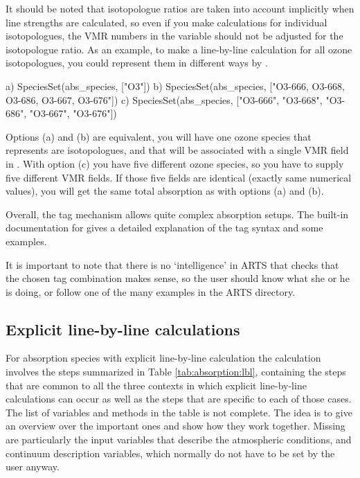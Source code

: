 It should be noted that isotopologue ratios are taken into account
implicitly when line strengths are calculated, so even if you make
calculations for individual isotopologues, the VMR numbers in the
variable  should not be adjusted for the isotopologue
ratio. As an example, to make a line-by-line calculation for all ozone
isotopologues, you could represent them in different ways by
.
\begin{code}
a) SpeciesSet(abs_species, 
              ["O3"])
b) SpeciesSet(abs_species, 
              ["O3-666, O3-668, O3-686, O3-667, O3-676"])
c) SpeciesSet(abs_species, 
              ["O3-666", "O3-668", "O3-686", "O3-667", "O3-676"])
\end{code}
Options (a) and (b) are equivalent, you will have one ozone species
that represents are isotopologues, and that will be associated with a
single VMR field in .  With option (c) you have
five different ozone species, so you have to supply five different VMR
fields. If those five fields are identical (exactly same numerical
values), you will get the same total absorption as with options (a)
and (b).

Overall, the tag mechanism allows quite complex
absorption setups. The built-in documentation for
 gives a detailed explanation of the tag syntax
and some examples.  

It is important to note that there is no `intelligence' in ARTS that
checks that the chosen tag combination makes sense, so the user should
know what she or he is doing, or follow one of the many examples in
the ARTS  directory.

\subsection{Explicit line-by-line calculations}

For absorption species with explicit line-by-line calculation the
calculation involves the steps summarized in Table
\ref{tab:absorption:lbl}, containing the steps that are common to all the
three contexts in which explicit line-by-line calculations can occur as well
as the steps that are specific to each of those cases. 
The list of variables and methods in the
table is not complete. The idea is to give an overview over the
important ones and show how they work together. Missing are
particularly the input variables that describe the atmospheric
conditions, and continuum description variables, which normally do not
have to be set by the user anyway.

